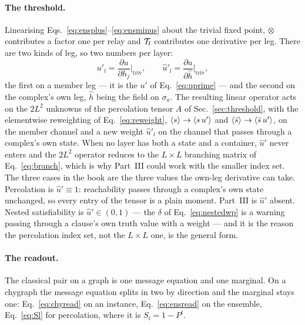 \paragraph{The threshold.} Linearising
Eqs.~\eqref{eq:ensplus}--\eqref{eq:ensminus} about the trivial fixed point,
$\otimes$ contributes a factor one per relay and $\mathcal{T}_{l}$ contributes one
derivative per leg. There are two kinds of leg, so two numbers per layer:
\begin{equation}
  u'_{l}=\frac{\partial u}{\partial h_{j}}\Big|_{\mathrm{triv}},
  \qquad
  \hat u'_{l}=\frac{\partial u}{\partial\hat h}\Big|_{\mathrm{triv}},
  \label{eq:ownleg}
\end{equation}
the first on a member leg --- it is the $u'$ of Eq.~\eqref{eq:uprime} --- and
the second on the complex's own leg, $\hat h$ being the field on
$\sigma_{a}$.
The resulting linear operator acts on the $2L^{2}$ unknowns of the
percolation tensor $A$ of Sec.~\ref{sec:threshold}, with the elementwise
reweighting of Eq.~\eqref{eq:reweight}, $\langle s \rangle\to\langle s\,u' \rangle$ and
$\langle \bar s \rangle\to\langle \bar s\,u' \rangle$, on the member channel and a new weight
$\hat u'_{l}$ on the channel that passes through a complex's own state. When
no layer has both a state and a container, $\hat u'$ never enters and the
$2L^{2}$ operator reduces to the $L\times L$ branching matrix of
Eq.~\eqref{eq:branch}, which is why Part~III could work with the smaller
index set. The three cases in the book are the three values the own-leg
derivative can take. Percolation is $\hat u'\equiv1$: reachability passes
through a complex's own state unchanged, so every entry of the tensor is a
plain moment. Part~III is $\hat u'$ absent. Nested satisfiability is
$\hat u'\in(0,1)$ --- the $\delta$ of Eq.~\eqref{eq:nestedwp} is a
warning passing through a clause's own truth value with a weight --- and it
is the reason the percolation index set, not the $L\times L$ one, is the
general form.

\paragraph{The readout.} The classical pair on a graph is one message
equation and one marginal. On a chygraph the message equation splits in two
by direction and the marginal stays one: Eq.~\eqref{eq:chyread} on an
instance, Eq.~\eqref{eq:ensread} on the ensemble, Eq.~\eqref{eq:Sl} for
percolation, where it is $S_{l}=1-P^{l}$.

